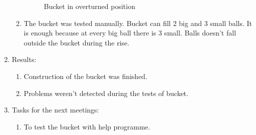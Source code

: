 \begin{enumerate}
\begin{enumerate}
\begin{figure}[H]
\begin{minipage}[h]{0.47\linewidth}
				\caption{Bucket in overturned position}
			\end{minipage}
		\end{figure}
		
		
		\item The bucket was tested manually. Bucket can fill 2 big and 3 small balls. It is enough because at every big ball there is 3 small. Balls doesn't fall outside the bucket during the rise.
		
		
	\end{enumerate}
	
	\item Results:
	\begin{enumerate}
		\item Construction of the bucket was finished.
		
		\item Problems weren't detected during the tests of bucket.
		
	\end{enumerate}
	
	\item Tasks for the next meetings:
	\begin{enumerate}
		\item To test the bucket with help programme.
		
	\end{enumerate}     
\end{enumerate}
\fillpage

